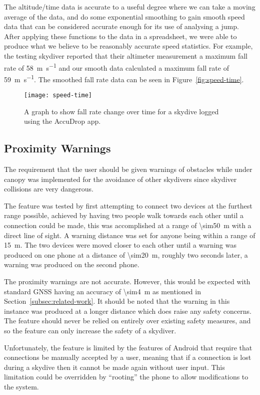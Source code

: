 The altitude/time data is accurate to a useful degree where we can take a moving average of the data, and do some exponential smoothing to gain smooth speed data that can be considered accurate enough for its use of analysing a jump. After applying these functions to the data in a spreadsheet, we were able to produce what we believe to be reasonably accurate speed statistics. For example, the testing skydiver reported that their altimeter measurement a maximum fall rate of \SI{58}{\metre\per\second} and our smooth data calculated a maximum fall rate of \SI{59}{\metre\per\second}. The smoothed fall rate data can be seen in Figure~\vref{fig:speed-time}.

\begin{figure}[ht]
  \centering
  \texttt{[image: speed-time]}
  \caption{A graph to show fall rate change over time for a skydive logged using the AccuDrop app.}\label{fig:speed-time}
\end{figure}

\subsection{Proximity Warnings}
The requirement that the user should be given warnings of obstacles while under canopy was implemented for the avoidance of other skydivers since skydiver collisions are very dangerous.

The feature was tested by first attempting to connect two devices at the furthest range possible, achieved by having two people walk towards each other until a connection could be made, this was accomplished at a range of \SI{\sim50}{\metre} with a direct line of sight. A warning distance was set for anyone being within a range of \SI{15}{\metre}. The two devices were moved closer to each other until a warning was produced on one phone at a distance of \SI{\sim20}{\metre}, roughly two seconds later, a warning was produced on the second phone.

The proximity warnings are not accurate. However, this would be expected with standard GNSS having an accuracy of \SI{\sim4}{\metre} as mentioned in Section~\ref{subsec:related-work}. It should be noted that the warning in this instance was produced at a longer distance which does raise any safety concerns. The feature should never be relied on entirely over existing safety measures, and so the feature can only increase the safety of a skydiver.

Unfortunately, the feature is limited by the features of Android that require that connections be manually accepted by a user, meaning that if a connection is lost during a skydive then it cannot be made again without user input. This limitation could be overridden by ``rooting'' the phone to allow modifications to the system.

